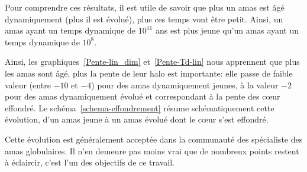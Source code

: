 		Pour comprendre ces résultats, il est utile de savoir que plus un amas est âgé
		dynamiquement (plus il est évolué), plus ces temps vont être petit. Ainsi, un amas
		ayant un temps dynamique de $10^{11}$ ans est plus jeune qu'un amas ayant un temps
		dynamique de $10^{8}$.

		
		Ainsi, les graphiques~\ref{Pente-lin_dim} et~\ref{Pente-Td-lin} nous apprennent que
		plus les amas sont âgé, plus la pente de leur halo est importante: elle passe de
		faible valeur (entre $-10$ et $-4$) pour des amas dynamiquement jeunes, à la valeur
		$-2$ pour des amas dynamiquement évolué et correspondant à la pente des cœur
		effondré.
		Le schéma~\ref{schema-effondrement} résume schématiquement cette évolution,
		d'un amas jeune à un amas évolué dont le cœur s'est effondré.

		Cette évolution est généralement acceptée dans la communauté des spécialiste des amas
		globulaires. Il n'en demeure pas moins vrai que de nombreux points restent à
		éclaircir, c'est l'un des objectifs de ce travail.


		

